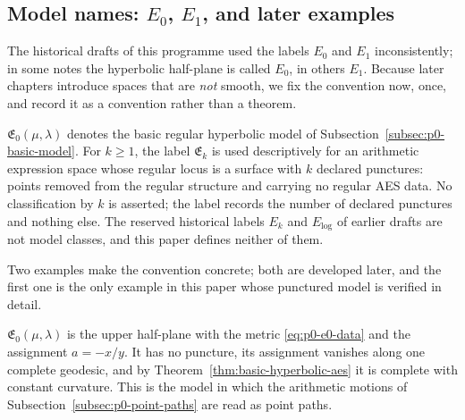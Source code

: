 \subsection{Model names: $E_0$, $E_1$, and later examples}
\label{subsec:p0-model-names}

The historical drafts of this programme used the labels $E_0$ and $E_1$
inconsistently; in some notes the hyperbolic half-plane is called $E_0$, in
others $E_1$.  Because later chapters introduce spaces that are \emph{not} smooth,
we fix the convention now, once, and record it as a convention rather than a
theorem.

\begin{convention}
\label{conv:p0-model-labels}
$\mathfrak E_0(\mu,\lambda)$ denotes the basic regular hyperbolic model of
Subsection~\ref{subsec:p0-basic-model}.  For $k\ge1$, the label
$\mathfrak E_k$ is used descriptively for an arithmetic expression space whose
regular locus is a surface with $k$ declared punctures: points removed from the
regular structure and carrying no regular AES data.  No classification by $k$
is asserted; the label records the number of declared punctures and nothing
else.  The reserved historical labels $E_k$ and $E_{\log}$ of earlier drafts
are not model classes, and this paper defines neither of them.
\end{convention}

Two examples make the convention concrete; both are developed later, and the
first one is the only example in this paper whose punctured model is verified
in detail.

\begin{example}[The basic model, $k=0$]
\label{ex:p0-e0-model}
$\mathfrak E_0(\mu,\lambda)$ is the upper half-plane with the metric
\eqref{eq:p0-e0-data} and the assignment $a=-x/y$.  It has no puncture, its
assignment vanishes along one complete geodesic, and by
Theorem~\ref{thm:basic-hyperbolic-aes} it is complete with constant curvature.
This is the model in which the arithmetic motions of
Subsection~\ref{subsec:p0-point-paths} are read as point paths.
\end{example}

